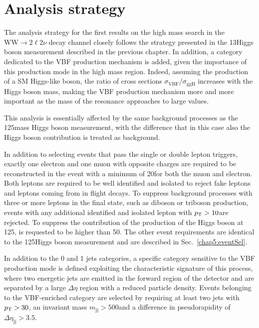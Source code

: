 \section{Analysis strategy}\label{chap6:AnalysisStrategy}

The analysis strategy for the first results on the high mass search in the $\mathrm{WW}\to2\ell2\nu$ decay channel closely follows the strategy presented in the 13\TeV Higgs boson measurement described in the previous chapter. In addition, a category dedicated to the VBF production mechanism is added, given the importance of this production mode in the high mass region. Indeed, assuming the production of a SM Higgs-like boson, the ratio of cross sections $\sigma_\mathrm{VBF}/\sigma_\mathrm{ggH}$ increases with the Higgs boson mass, making the VBF production mechanism more and more important as the mass of the resonance approaches to large values.

This analysis is essentially affected by the same background processes as the 125\GeV mass Higgs boson measurement, with the difference that in this case also the Higgs boson contribution is treated as background.

In addition to selecting events that pass the single or double lepton triggers, exactly one electron and one muon with opposite charges are required to be reconstructed in the event with a minimum \pt of 20\GeV for both the muon and electron. Both leptons are
required to be well identified and isolated to reject fake leptons and leptons
coming from in flight decays. To suppress background processes with three or more leptons in the final state, such as diboson or triboson production, events with any additional identified and isolated 
lepton with $p_\mathrm{T}>10$\GeV are rejected. To suppress the contribution of the production of the Higgs boson at 125\GeV, \mll is requested to be higher than 50\GeV. The other event requirements are identical to the 125\GeV Higgs boson measurement and are described in Sec.~\ref{chap5:eventSel}.

In addition to the 0 and 1 jets categories, a specific category sensitive to the VBF production mode is defined exploiting the characteristic signature of this process, where two energetic jets are emitted in the forward region of the detector and are separated by a large $\Delta\eta$ region with a reduced particle density. Events belonging to the VBF-enriched category are selected by requiring at least two jets with $p_\mathrm{T}>30$\GeV, an invariant mass $m_\mathrm{jj}>500$\GeV and a difference in pseudorapidity of $\Delta\eta_\mathrm{jj}>3.5$.

